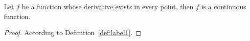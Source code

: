 \begin{theorem}
	\label{th:1}
	Let $f$ be a function whose derivative exists in every point, then $f$ is a continuous function.
\end{theorem}
\begin{proof}
	According to Definition~\ref{def:label1}.
\end{proof}